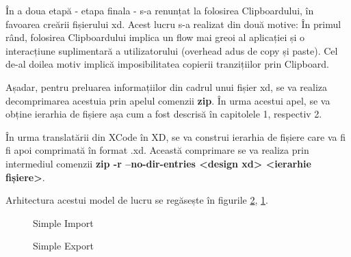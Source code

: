 În a doua etapă - etapa finala - s-a renunțat la folosirea Clipboardului, în favoarea creării fișierului xd. 
Acest lucru s-a realizat din două motive: În primul rând, folosirea Clipboardului implica un flow mai greoi al aplicației și o interacțiune suplimentară a utilizatorului (overhead adus de copy și paste). Cel de-al doilea motiv implică imposibilitatea copierii tranzițiilor prin Clipboard.

Așadar, pentru preluarea informațiilor din cadrul unui fișier xd, se va realiza decomprimarea acestuia prin apelul comenzii \textbf{zip}. În urma acestui apel, se va obține ierarhia de fișiere așa cum a fost descrisă în capitolele 1, respectiv 2.

În urma translatării din XCode în XD, se va construi ierarhia de fișiere care va fi fi apoi comprimată în format .xd. Această comprimare se va realiza prin intermediul comenzii \textbf{zip -r --no-dir-entries <design xd> <ierarhie fișiere>}. 

Arhitectura acestui model de lucru se regăsește în figurile \ref{fig:Export}, \ref{fig:Import}.

\begin{figure}[!htbp]
\centering
{}
\caption{Simple Import} \label{fig:Import}
\end{figure}

\begin{figure}[!htbp]
\centering
{}
\caption{Simple Export} \label{fig:Export}
\end{figure}


